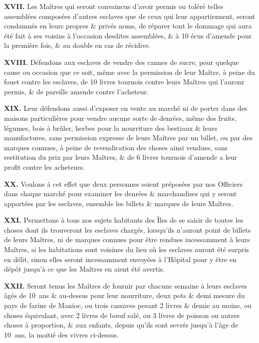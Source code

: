 \documentclass[french,twoside]{book} %
\newcommand{\labelchar}[1]{\textbf{\color{rubric} #1}}
\begin{document}
\labelchar{XVII.} Les Maîtres qui seront convaincus d’avoir permis ou toléré telles assemblées composées d’autres esclaves que de ceux qui leur appartiennent, seront condamnés en leurs propres \& privés noms, de réparer tout le dommage qui aura été fait à ses voisins à l’occasion desdites assemblées, \& à 10 écus d’amende pour la première fois, \& au double en cas de récidive.\par
\labelchar{XVIII.} Défendons aux esclaves de vendre des cannes de sucre, pour quelque cause ou occasion que ce soit, même avec la permission de leur Maître, à peine du fouet contre les esclaves, de 10 livres tournois contre leurs Maîtres qui l’auronr permis, \& de pareille amende contre l’acheteur.\par
\labelchar{XIX.} Leur défendons aussi d’exposer en vente au marché ni de porter dans des maisons particulières pour vendre aucune sorte de denrées, même des fruits, légumes, bois à brûler, herbes pour la nourriture des bestiaux \& leurs manufactures, sans permission expresse de leurs Maîtres par un billet, ou par des marques connues, à peine de revendication des choses ainsi vendues, sans restitution du prix par leurs Maîtres, \& de 6 livres tournois d’amende a leur profit contre les acheteurs.\par
\labelchar{XX.} Voulons à cet effet que deux personnes soient préposées par nos Officiers dans chaque marché pour examiner les denrées \& marchandises qui y seront apportées par les esclaves, ensemble les billets \& marques de leurs Maîtres.\par
\labelchar{XXI.} Permettons à tous nos sujets habitants des Îles de se saisir de toutes les choses dont ils trouveront les esclaves chargés, lorsqu’ils n’auront point de billets de leurs Maîtres, ni de marques connues pour être rendues incessamment à leurs Maîtres, si les habitations sont voisines du lieu où les esclaves auront été surpris en délit, sinon elles seront incessamment envoyées à l’Hôpital pour y être en dépôt jusqu’à ce que les Maîtres en aient été avertis.\par
\labelchar{XXII.} Seront tenus les Maîtres de fournir par chacune semaine à leurs esclaves âgés de 10 ans \& au-dessus pour leur nourriture, deux pots \& demi mesure du pays de farine de Manioc, ou trois cassaves pesant 2 livres \& demie au moins, ou choses équivalant, avec 2 livres de bœuf salé, ou 3 livres de poisson ou autres choses à proportion, \& aux enfants, depuis qu’ils sont sevrés jusqu’à l’âge de 10 ans, la moitié des vivres ci-dessus.\par
\end{document}
